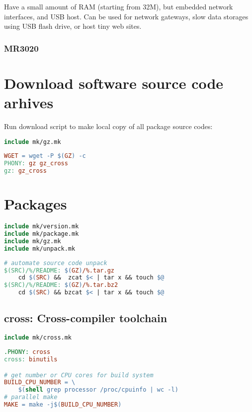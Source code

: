 Have a small amount of RAM (starting from 32M), but embedded network
interfaces, and USB host. Can be used for network gateways, slow data
storages using USB flash drive, or host tiny web sites.

\subsubsection{MR3020}

\section{Download software source code arhives}

Run download script to make local copy of all package source codes:
\begin{lstlisting}[language=make,title=Makefile]
include mk/gz.mk
\end{lstlisting}
\begin{lstlisting}[language=make,title=mk/gz]
WGET = wget -P $(GZ) -c	
PHONY: gz gz_cross
gz: gz_cross
\end{lstlisting}

\section{Packages}

\begin{lstlisting}[language=make,title=Makefile]
include mk/version.mk
include mk/package.mk
include mk/gz.mk
include mk/unpack.mk
\end{lstlisting}

\begin{lstlisting}[language=make,title=mk/unpack]
# automate source code unpack
$(SRC)/%/README: $(GZ)/%.tar.gz
	cd $(SRC) &&  zcat $< | tar x && touch $@
$(SRC)/%/README: $(GZ)/%.tar.bz2
	cd $(SRC) && bzcat $< | tar x && touch $@
\end{lstlisting}

\subsection{cross: Cross-compiler toolchain}

\begin{lstlisting}[language=make,title=Makefile]
include mk/cross.mk
\end{lstlisting}

\begin{lstlisting}[language=make,title=mk/cross]
.PHONY: cross
cross: binutils

# get number or CPU cores for build system
BUILD_CPU_NUMBER = \
	$(shell grep processor /proc/cpuinfo | wc -l)
# parallel make
MAKE = make -j$(BUILD_CPU_NUMBER)
\end{lstlisting}

